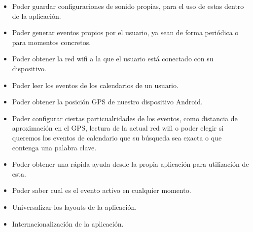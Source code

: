\begin{itemize}
	\item Poder guardar configuraciones de sonido propias, para el uso de estas dentro de la aplicación.
	\item Poder generar eventos propios por el usuario, ya sean de forma periódica o para momentos concretos.
	\item Poder obtener la red wifi a la que el usuario está conectado con su dispositivo.
	\item Poder leer los eventos de los calendarios de un usuario.
	\item Poder obtener la posición GPS de nuestro dispositivo Android.
	\item Poder configurar ciertas particualridades de los eventos, como distancia de aproximación en el GPS, lectura de la actual red wifi o poder elegir si queremos los eventos de calendario que su búsqueda sea exacta o que contenga una palabra clave.
	\item Poder obtener una rápida ayuda desde la propia aplicación para utilización de esta.
	\item Poder saber cual es el evento activo en cualquier momento.
	\item Universalizar los layouts de la aplicación.
	\item Internacionalización de la aplicación.
\end{itemize}